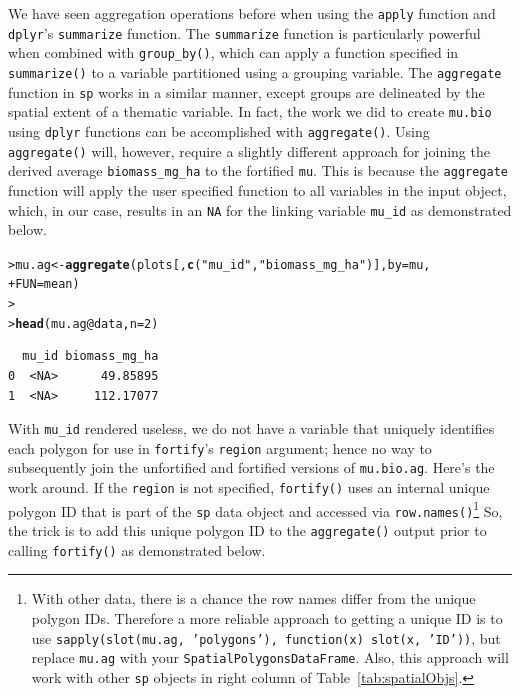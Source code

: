 \documentclass[12pt,oneside]{book}\usepackage[]{graphicx}\usepackage[]{color}
\makeatletter
\newcommand{\hlnum}[1]{\textcolor[rgb]{0.686,0.059,0.569}{#1}}%
\newcommand{\hlstr}[1]{\textcolor[rgb]{0.192,0.494,0.8}{#1}}%
\newcommand{\hlopt}[1]{\textcolor[rgb]{0,0,0}{#1}}%
\newcommand{\hlstd}[1]{\textcolor[rgb]{0.345,0.345,0.345}{#1}}%
\newcommand{\hlkwb}[1]{\textcolor[rgb]{0.69,0.353,0.396}{#1}}%
\newcommand{\hlkwc}[1]{\textcolor[rgb]{0.333,0.667,0.333}{#1}}%
\newcommand{\hlkwd}[1]{\textcolor[rgb]{0.737,0.353,0.396}{\textbf{#1}}}%
\newenvironment{kframe}{%
 \def\at@end@of@kframe{}%
 \ifinner\ifhmode%
  \def\at@end@of@kframe{\end{minipage}}%
  \begin{minipage}{\columnwidth}%
 \fi\fi%
 \def\FrameCommand##1{\hskip\@totalleftmargin \hskip-\fboxsep
 \colorbox{shadecolor}{##1}\hskip-\fboxsep
     \hskip-\linewidth \hskip-\@totalleftmargin \hskip\columnwidth}%
 \MakeFramed {\advance\hsize-\width
   \@totalleftmargin\z@ \linewidth\hsize
   \@setminipage}}%
 {\par\unskip\endMakeFramed%
 \at@end@of@kframe}
\newenvironment{knitrout}{}{} %
\makeatother
\begin{document}
We have seen aggregation operations before when using the \verb+apply+ function and \verb+dplyr+'s \verb+summarize+ function. The \verb+summarize+ function is particularly powerful when combined with \verb+group_by()+, which can apply a function specified in \verb+summarize()+ to a variable partitioned using a grouping variable. The \verb+aggregate+ function in \verb+sp+ works in a similar manner, except groups are delineated by the spatial extent of a thematic variable. In fact, the work we did to create \verb+mu.bio+ using \verb+dplyr+ functions can be accomplished with \verb+aggregate()+. Using \verb+aggregate()+ will, however, require a slightly different approach for joining the derived average \verb+biomass_mg_ha+ to the fortified \verb+mu+. This is because the \verb+aggregate+ function will apply the user specified function to all variables in the input object, which, in our case, results in an \verb+NA+ for the linking variable \verb+mu_id+ as demonstrated below. 
\begin{knitrout}
\color{fgcolor}\begin{kframe}
\begin{alltt}
\hlstd{> }\hlstd{mu.ag} \hlkwb{<-} \hlkwd{aggregate}\hlstd{(plots[,} \hlkwd{c}\hlstd{(}\hlstr{"mu_id"}\hlstd{,} \hlstr{"biomass_mg_ha"}\hlstd{)],} \hlkwc{by} \hlstd{= mu,}
\hlstd{+ }    \hlkwc{FUN} \hlstd{= mean)}
\hlstd{> }
\hlstd{> }\hlkwd{head}\hlstd{(mu.ag}\hlopt{@}\hlkwc{data}\hlstd{,} \hlkwc{n} \hlstd{=} \hlnum{2}\hlstd{)}
\end{alltt}
\begin{verbatim}
  mu_id biomass_mg_ha
0  <NA>      49.85895
1  <NA>     112.17077
\end{verbatim}
\end{kframe}
\end{knitrout}
With \verb+mu_id+ rendered useless, we do not have a variable that uniquely identifies each polygon for use in \verb+fortify+'s \verb+region+ argument; hence no way to subsequently join the unfortified and fortified versions of \verb+mu.bio.ag+. Here's the work around. If the \verb+region+ is not specified, \verb+fortify()+ uses an internal unique polygon ID that is part of the \verb+sp+ data object and accessed via \verb+row.names()+\footnote{With other data, there is a chance the row names differ from the unique polygon IDs. Therefore a more reliable approach to getting a unique ID is to use \texttt{sapply(slot(mu.ag, 'polygons'), function(x) slot(x, 'ID'))}, but replace \texttt{mu.ag} with your \texttt{SpatialPolygonsDataFrame}. Also, this approach will work with other \texttt{sp} objects in right column of Table~\ref{tab:spatialObjs}.} So, the trick is to add this unique polygon ID to the \verb+aggregate()+ output prior to calling \verb+fortify()+ as demonstrated below.
\end{document}
